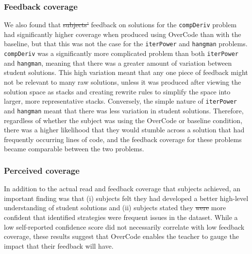 \documentclass[12pt,twoside]{mitthesis}
\newcommand \codevar[1]{\texttt{#1}}
\providecommand{\DIFaddtex}[1]{{\protect\color{blue}\uwave{#1}}} %
\providecommand{\DIFdeltex}[1]{{\protect\color{red}\sout{#1}}}                      %
\providecommand{\DIFaddbegin}{} %
\providecommand{\DIFaddend}{} %
\providecommand{\DIFdelbegin}{} %
\providecommand{\DIFdelend}{} %
\providecommand{\DIFadd}[1]{\texorpdfstring{\DIFaddtex{#1}}{#1}} %
\providecommand{\DIFdel}[1]{\texorpdfstring{\DIFdeltex{#1}}{}} %
\begin{document}
\subsubsection{Feedback coverage}
We also found that \DIFdelbegin \DIFdel{subjects' }\DIFdelend \DIFaddbegin \DIFadd{subject-written }\DIFaddend feedback on solutions for the \codevar{compDeriv} problem had significantly higher coverage when produced using OverCode than with the baseline, but that this was not the case for the \codevar{iterPower} and \codevar{hangman} problems. \codevar{compDeriv} was a significantly more complicated problem than both \codevar{iterPower} and \codevar{hangman}, meaning that there was a greater amount of variation between student solutions. This high variation meant that any one piece of feedback might not be relevant to many raw solutions, unless it was produced after viewing the solution space as stacks and creating rewrite rules to simplify the space into larger, more representative stacks. Conversely, the simple nature of \codevar{iterPower} and \codevar{hangman} meant that there was less variation in student solutions. Therefore, regardless of whether the subject was using the OverCode or baseline condition, there was a higher likelihood that they would stumble across a solution that had frequently occurring lines of code, and the feedback coverage for these problems became comparable between the two problems.

\subsubsection{Perceived coverage}
In addition to the actual read and feedback coverage that subjects achieved, an important finding was that (i) subjects felt they had developed a better high-level understanding of student solutions and (ii) subjects stated they \DIFdelbegin \DIFdel{were }\DIFdelend \DIFaddbegin \DIFadd{felt }\DIFaddend more confident that identified strategies were frequent issues in the dataset. While a low self-reported confidence score did not necessarily correlate with low feedback coverage, these results suggest that OverCode enables the teacher to gauge the impact that their feedback will have.


\end{document}
